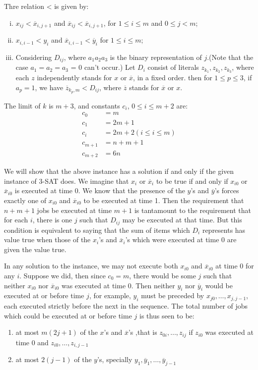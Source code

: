 \documentclass{llncs}
\begin{document}
Thre relation < is given by:
\begin{enumerate}[(i)]
    \item $x_{ij} < \overline x_{i,j+1}$ and $\overline x_{ij} < \overline x_{i,j+1}$, for $1 \leq i \leq m$ and $0 \leq j < m$;
    \item $x_{i,i-1} < y_i$ and $\overline x_{i,i-1} < \overline y_i$ for $1 \leq i \leq m$;
    \item Considering $D_{ij}$, where $a_1 a_2 a_3$ is the binary representation of $j$.(Note that the case $a_1 = a_2 = a_3$ = 0 can't occur.) Let $D_i$ consist of literals $z_{k_1},z_{k_2},z_{k_3}$, where each $z$ independently stands for $x$ or $\overline x$, in a fixed order. then for $1 \leq p \leq 3$, if $a_p = 1$, we have $\overline z_{k_p,m} < D_{ij}$, where $\overline z$ stands for $\overline x$ or $x$.
\end{enumerate}

The limit of $k$ is $m + 3$, and constants $c_i$, $0 \leq i \leq m + 2$ are:
\begin{align*}
c_0 &= m\\ c_1 &= 2m+1\\ c_i &= 2m+2(i \leq i \leq m)\\ c_{m+1} &= n+m+1\\ c_{m+2} &= 6n    
\end{align*}

We will show that the above instance has a solution if and only if the given instance of \textsc{3-SAT} does. We imagine that $x_i$ or $\overline x_i$ to be true if and only if $x_{i0}$ or $\overline x_{i0}$ is executed at time 0. We know that the presence of the $y$'s and $\overline y$'s forces exactly one of $x_{i0}$ and $\overline x_{i0}$ to be executed at time 1. Then the requirement that $n+m+1$ jobs be executed at time $m+1$ is tantamount to the requirement that for each $i$, there is one $j$ such that $D_{ij}$ may be executed at that time. But this condition is equivalent to saying that the sum of items which $D_i$ represents has value true when those of the $x_i$'s and $\overline x_i$'s which were executed at time 0 are given the value true.

In any solution to the instance, we may not execute both $x_{i0}$ and $\overline x_{i0}$ at time 0 for any $i$. Suppose we did, then since $c_0=m$, there would be some $j$ such that neither $x_{i0}$ nor $\overline x_{i0}$ was executed at time 0. Then neither $y_i$ nor $\overline y_i$ would be executed at or before time $j$, for example, $y_i$ must be preceded by $x_{j0},\ldots,x_{j,j-1}$, each executed strictly before the next in the sequence. The total number of jobs which could be executed at or before time $j$ is thus seen to be:
\begin{enumerate}[(1)]
    \item  at most $m(2j+1)$ of the $x$'s and $\overline x$'s ,that is $z_{0i},\ldots,z_{ij}$ if $z_{i0}$ was executed at time 0 and $z_{i0},\ldots,z_{i,j-1}$
    \item at most $2(j-1)$ of the $y$'s, specially $y_1,\overline y_1,\ldots,\overline y_{j-1}$
\end{enumerate}
\end{document}
